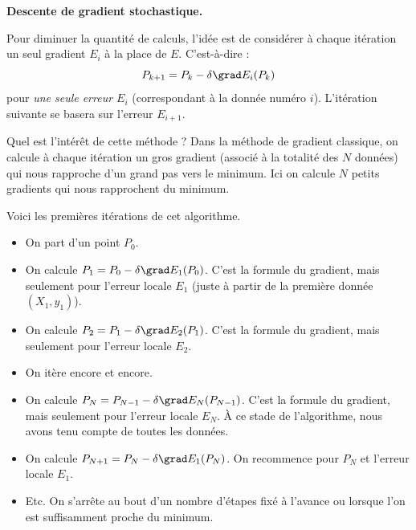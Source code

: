 \documentclass[10pt,class=report,crop=false]{standalone}
\begin{document}
\textbf{Descente de gradient stochastique.}

Pour diminuer la quantité de calculs, l'idée est de considérer à chaque itération un seul gradient $E_i$ à la place de $E$. C'est-à-dire : 
$$P_{k+1} = P_k - \delta \grad E_i (P_k)$$
pour \emph{une seule erreur $E_i$} (correspondant à la donnée numéro $i$).
L'itération suivante se basera sur l'erreur $E_{i+1}$.


Quel est l'intérêt de cette méthode ? 
Dans la méthode de gradient classique, on calcule à chaque itération un \og{}gros\fg{} gradient (associé à la totalité des $N$ données) qui nous rapproche d'un grand pas vers le minimum.
Ici on calcule $N$ \og{}petits\fg{} gradients qui nous rapprochent du minimum.%





Voici les premières itérations de cet algorithme.
\begin{itemize}
  \item On part d'un point $P_0$.
  
  \item On calcule $P_1 = P_0 - \delta \grad E_1 (P_0)$. C'est la formule du gradient, mais seulement pour l'erreur locale $E_1$ (juste à partir de la première donnée $(X_1,y_1)$).
  
  \item On calcule $P_2 = P_1 - \delta \grad E_2 (P_1)$. C'est la formule du gradient, mais seulement pour l'erreur locale $E_2$.
  
  \item On itère encore et encore.
  
  \item On calcule $P_{N} = P_{N-1} - \delta \grad E_N (P_{N-1})$. C'est la formule du gradient, mais seulement pour l'erreur locale $E_N$. À ce stade de l'algorithme, nous avons tenu compte de toutes les données. 
  
  \item On calcule $P_{N+1} = P_{N} - \delta \grad E_1 (P_{N})$. On recommence pour $P_N$ et l'erreur locale $E_1$.
  
  \item Etc. On s'arrête au bout d'un nombre d'étapes fixé à l'avance ou lorsque l'on est suffisamment proche du minimum.   
\end{itemize}
\end{document}
